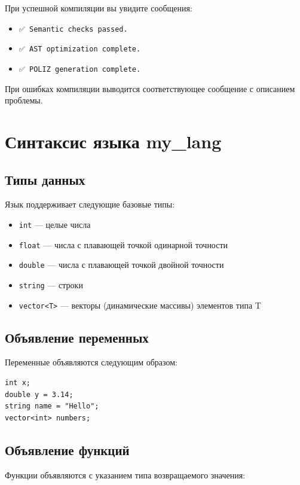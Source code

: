 \documentclass[12pt,a4paper]{article}
\begin{document}
При успешной компиляции вы увидите сообщения:
\begin{itemize}
    \item \texttt{✅ Semantic checks passed.}
    \item \texttt{✅ AST optimization complete.}
    \item \texttt{✅ POLIZ generation complete.}
\end{itemize}

При ошибках компиляции выводится соответствующее сообщение с описанием проблемы.

\section{Синтаксис языка my\_lang}

\subsection{Типы данных}

Язык поддерживает следующие базовые типы:
\begin{itemize}
    \item \texttt{int} --- целые числа
    \item \texttt{float} --- числа с плавающей точкой одинарной точности
    \item \texttt{double} --- числа с плавающей точкой двойной точности
    \item \texttt{string} --- строки
    \item \texttt{vector<T>} --- векторы (динамические массивы) элементов типа T
\end{itemize}

\subsection{Объявление переменных}

Переменные объявляются следующим образом:

\begin{lstlisting}
int x;
double y = 3.14;
string name = "Hello";
vector<int> numbers;
\end{lstlisting}

\subsection{Объявление функций}

Функции объявляются с указанием типа возвращаемого значения:
\end{document}
